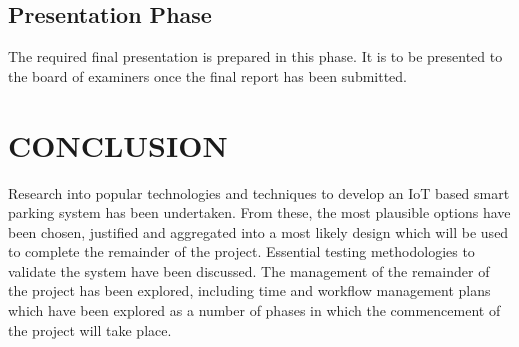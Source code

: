 \documentclass[10pt,twocolumn]{witseiepaper}
\begin{document}
	\subsection{Presentation Phase}
		The required final presentation is prepared in this phase. It is to be presented to the board of examiners once the final report has been submitted.
	

\section{CONCLUSION}

Research into popular technologies and techniques to develop an IoT based smart parking system has been undertaken. From these, the most plausible options have been chosen, justified and aggregated into a most likely design which will be used to complete the remainder of the project. Essential testing methodologies to validate the system have been discussed. The management of the remainder of the project has been explored, including time and workflow management plans which have been explored as a number of phases in which the commencement of the project will take place.

{}

\end{document}
